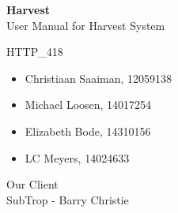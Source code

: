 \documentclass[11pt,fleqn]{book} %
\begin{document}

\begingroup
\thispagestyle{empty}
\centering
\vspace*{4.5cm}
\par\normalfont\fontsize{35}{20}\sffamily\selectfont
\textbf{Harvest}\\
{\LARGE User Manual for Harvest System}\par %
\vspace*{0.5cm}
{\Huge HTTP\_418}\par
\centering
\vspace*{0.5cm}
\begin{itemize}[label={}, noitemsep]	
		\Large
		\item \begin{center} Christiaan Saaiman, 12059138 \end{center}
		\item \begin{center} Michael Loosen, 14017254 \end{center}
		\item \begin{center} Elizabeth Bode, 14310156 \end{center}
		\item \begin{center} LC Meyers, 14024633 \end{center}	
\end{itemize}
\begin{center}{\Huge Our Client\\\Large SubTrop - Barry Christie} \end{center}
\endgroup



\pagestyle{empty} %

\tableofcontents %

\end{document}

